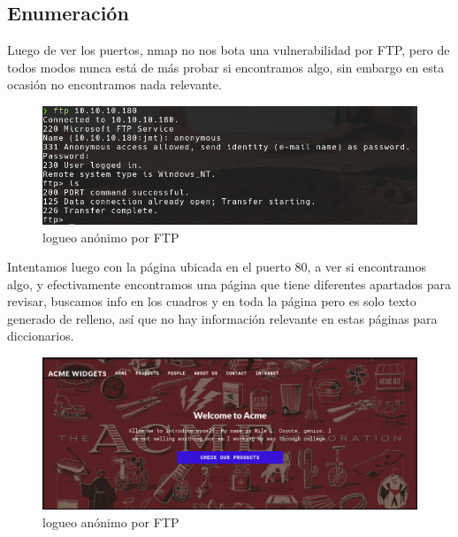 \documentclass{article}
\begin{document}
\subsection{Enumeración}

Luego de ver los puertos, nmap no nos bota una vulnerabilidad por FTP, pero de todos modos nunca está de más probar si encontramos algo, sin embargo en esta ocasión no encontramos nada relevante.
\begin{figure}[h!]
	\center 
	\includegraphics[width=\textwidth]{images/remote/ftp.png}
	\caption{logueo anónimo por FTP}
\end{figure}

Intentamos luego con la página ubicada en el puerto 80, a ver si encontramos algo, y efectivamente encontramos una página que tiene diferentes apartados para revisar, buscamos info en los cuadros y en toda la página pero es solo texto generado de relleno, así que no hay información relevante en estas páginas para diccionarios.
\begin{figure}[h!]
	\center 
	\includegraphics[width=\textwidth]{images/remote/index_pagina.png}
	\caption{logueo anónimo por FTP}
\end{figure}

\clearpage
\end{document}

